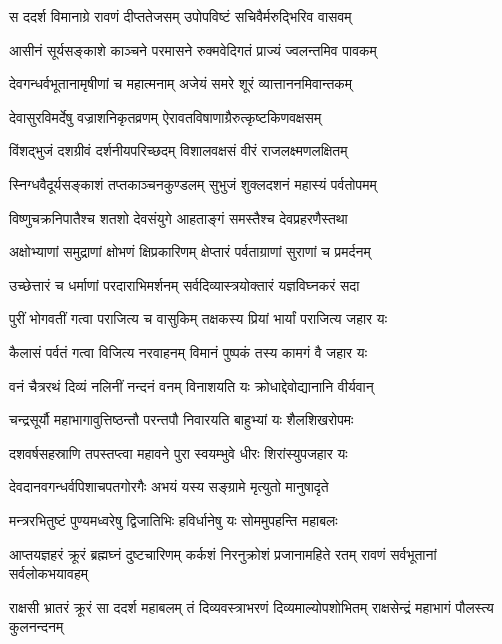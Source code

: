 \twolineshloka
{स ददर्श विमानाग्रे रावणं दीप्ततेजसम्}
{उपोपविष्टं सचिवैर्मरुद्भिरिव वासवम्} %

\twolineshloka
{आसीनं सूर्यसङ्काशे काञ्चने परमासने}
{रुक्मवेदिगतं प्राज्यं ज्वलन्तमिव पावकम्} %

\twolineshloka
{देवगन्धर्वभूतानामृषीणां च महात्मनाम्}
{अजेयं समरे शूरं व्यात्ताननमिवान्तकम्} %

\twolineshloka
{देवासुरविमर्देषु वज्राशनिकृतव्रणम्}
{ऐरावतविषाणाग्रैरुत्कृष्टकिणवक्षसम्} %

\twolineshloka
{विंशद्भुजं दशग्रीवं दर्शनीयपरिच्छदम्}
{विशालवक्षसं वीरं राजलक्ष्मणलक्षितम्} %

\twolineshloka
{स्निग्धवैदूर्यसङ्काशं तप्तकाञ्चनकुण्डलम्}
{सुभुजं शुक्लदशनं महास्यं पर्वतोपमम्} %

\twolineshloka
{विष्णुचक्रनिपातैश्च शतशो देवसंयुगे}
{आहताङ्गं समस्तैश्च देवप्रहरणैस्तथा} %

\twolineshloka
{अक्षोभ्याणां समुद्राणां क्षोभणं क्षिप्रकारिणम्}
{क्षेप्तारं पर्वताग्राणां सुराणां च प्रमर्दनम्} %

\twolineshloka
{उच्छेत्तारं च धर्माणां परदाराभिमर्शनम्}
{सर्वदिव्यास्त्रयोक्तारं यज्ञविघ्नकरं सदा} %

\twolineshloka
{पुरीं भोगवतीं गत्वा पराजित्य च वासुकिम्}
{तक्षकस्य प्रियां भार्यां पराजित्य जहार यः} %

\twolineshloka
{कैलासं पर्वतं गत्वा विजित्य नरवाहनम्}
{विमानं पुष्पकं तस्य कामगं वै जहार यः} %

\twolineshloka
{वनं चैत्ररथं दिव्यं नलिनीं नन्दनं वनम्}
{विनाशयति यः क्रोधाद्देवोद्यानानि वीर्यवान्} %

\twolineshloka
{चन्द्रसूर्यौ महाभागावुत्तिष्ठन्तौ परन्तपौ}
{निवारयति बाहुभ्यां यः शैलशिखरोपमः} %

\twolineshloka
{दशवर्षसहस्राणि तपस्तप्त्वा महावने}
{पुरा स्वयम्भुवे धीरः शिरांस्युपजहार यः} %

\twolineshloka
{देवदानवगन्धर्वपिशाचपतगोरगैः}
{अभयं यस्य सङ्ग्रामे मृत्युतो मानुषादृते} %

\twolineshloka
{मन्त्ररभितुष्टं पुण्यमध्वरेषु द्विजातिभिः}
{हविर्धानेषु यः सोममुपहन्ति महाबलः} %

\threelineshloka
{आप्तयज्ञहरं क्रूरं ब्रह्मघ्नं दुष्टचारिणम्}
{कर्कशं निरनुक्रोशं प्रजानामहिते रतम्}
{रावणं सर्वभूतानां सर्वलोकभयावहम्} %

\threelineshloka
{राक्षसी भ्रातरं क्रूरं सा ददर्श महाबलम्}
{तं दिव्यवस्त्राभरणं दिव्यमाल्योपशोभितम्}
{राक्षसेन्द्रं महाभागं पौलस्त्य कुलनन्दनम्} %

